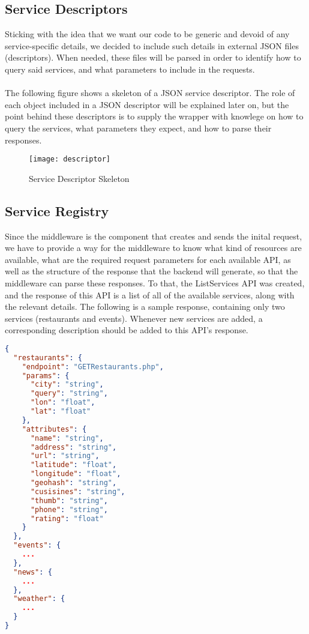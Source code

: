 \subsection{Service Descriptors}
Sticking with the idea that we want our code to be generic and devoid of any service-specific details, we decided to include such details in external JSON files (descriptors). When needed, these files will be parsed in order to identify how to query said services, and what parameters to include in the requests.\\\\
The following figure shows a skeleton of a JSON service descriptor. The role of each object included in a JSON descriptor will be explained later on, but the point behind these descriptors is to supply the wrapper with knowlege on how to query the services, what parameters they expect, and how to parse their responses.
\newpage
\begin{figure}[h]
\centering
\texttt{[image: descriptor]}
\caption{Service Descriptor Skeleton}
\end{figure}
\subsection{Service Registry}
\noindent Since the middleware is the component that creates and sends the inital request, we have to provide a way for the middleware to know what kind of resources are available, what are the required request parameters for each available API, as well as the structure of the response that the backend will generate, so that the middleware can parse these responses. To that, the ListServices API was created, and the response of this API is a list of all of the available services, along with the relevant details. The following is a sample response, containing only two services (restaurants and events). Whenever new services are added, a corresponding description should be added to this API's response.
\newpage
\begin{lstlisting}[language=json,firstnumber=1]
{
  "restaurants": {
    "endpoint": "GETRestaurants.php",
    "params": {
      "city": "string",
      "query": "string",
      "lon": "float",
      "lat": "float"
    },
    "attributes": {
      "name": "string",
      "address": "string",
      "url": "string",
      "latitude": "float",
      "longitude": "float",
      "geohash": "string",
      "cusisines": "string",
      "thumb": "string",
      "phone": "string",
      "rating": "float"
    }
  },
  "events": {
    ...
  },
  "news": {
    ...
  },
  "weather": {
    ...
  }
}
\end{lstlisting}
\pagebreak
